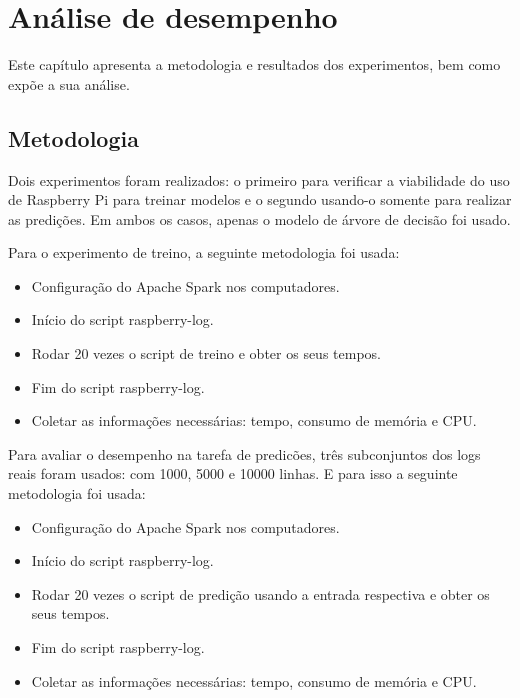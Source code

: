 
\chapter{Análise de desempenho}
\label{cap:results}

Este capítulo apresenta a metodologia e resultados dos experimentos, bem como 
expõe a sua análise.

\section{Metodologia}

Dois experimentos foram realizados: o primeiro para verificar a viabilidade do uso 
de Raspberry Pi para treinar modelos e o segundo usando-o somente para realizar as
predições. Em ambos os casos, apenas o modelo de árvore de decisão foi usado.

Para o experimento de treino, a seguinte metodologia foi usada:

\begin{itemize}
    \item Configuração do Apache Spark nos computadores.
    \item Início do script raspberry-log. 
    \item Rodar 20 vezes o script de treino e obter os seus tempos.
    \item Fim do script raspberry-log. 
    \item Coletar as informações necessárias: tempo, consumo de memória e CPU.
\end{itemize}

Para avaliar o desempenho na tarefa de predicões, três subconjuntos
dos logs reais foram usados: com 1000, 5000 e 10000 linhas. E para isso a seguinte 
metodologia foi usada: 

\begin{itemize}
    \item Configuração do Apache Spark nos computadores.
    \item Início do script raspberry-log. 
    \item Rodar 20 vezes o script de predição usando a entrada respectiva e obter os seus tempos.
    \item Fim do script raspberry-log. 
    \item Coletar as informações necessárias: tempo, consumo de memória e CPU.
\end{itemize}


